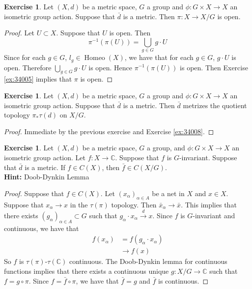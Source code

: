 \documentclass[12pt]{amsart}
\theoremstyle{definition}
\newtheorem{ex}[definition]{Exercise}
\newcommand{\al}{\alpha}
\newcommand{\C}{\mathbb{C}}
\newcommand{\conv}[1]{\xrightarrow{#1}}
\DeclareMathOperator{\Homeo}{Homeo}
\newcommand{\rex}[1]{Exercise \ref{ex:#1}}
\begin{document}
	\begin{ex}
	Let $(X,d)$ be a metric space, $G$ a group and $\phi: G \times X \rightarrow X$ an isometric group action. Suppose that $\bar{d}$ is a metric. Then $\pi:X \rightarrow X/G$ is open.
	\end{ex}
	
	\begin{proof}
	Let $U \subset X$. Suppose that $U$ is open. Then 
	\begin{equation*}
	\pi^{-1}(\pi(U)) = \bigcup_{g \in G} g \cdot U
	\end{equation*}		
	Since for each $g \in G$, $l_g \in \Homeo(X)$, we have that for each $g \in G$, $g \cdot U$ is open. Therefore $\bigcup\limits_{g \in G} g \cdot U$ is open. Hence $\pi^{-1}(\pi(U))$ is open. Then \rex{34005} implies that $\pi$ is open.
	\end{proof}
	
	\begin{ex}
	Let $(X,d)$ be a metric space, $G$ a group and $\phi: G \times X \rightarrow X$ an isometric group action. Suppose that $\bar{d}$ is a metric. Then $\bar{d}$ metrizes the quotient topology $\pi_*\tau(d)$ on $X/G$.
	\end{ex}
	
	\begin{proof}
	Immediate by the previous exercise and \rex{34008}.
	\end{proof}
	
	\begin{ex}
	Let $(X, d)$ be a metric space, $G$ a group, and $\phi: G \times X \rightarrow X$ an isometric group action. Let $f: X \rightarrow \C$. Suppose that $f$ is $G$-invariant. Suppose that $\bar{d}$ is a metric. If $f \in C(X)$, then $\bar{f} \in C(X/G)$.  \\
	\textbf{Hint:} Doob-Dynkin Lemma
	\end{ex}
	
	\begin{proof}
	Suppose that $f \in C(X)$. Let $(x_{\al})_{\al \in A}$ be a net in $X$ and $x \in X$. Suppose that $x_{\al} \rightarrow x$ in the $\tau(\pi)$ topology. Then $\bar{x}_{\al} \rightarrow \bar{x}$. This implies that there exists $(g_{\al})_{\al \in A} \subset G$ such that $g_{\al} \cdot x_{\al} \conv{d} x$. Since $f$ is $G$-invariant and continuous, we have that 
	\begin{align*}
	f(x_{\al})
	&= f(g_{\al} \cdot x_{\al}) \\
	& \rightarrow f(x)
	\end{align*}
	So $f$ is $\tau(\pi)$-$\tau(\C)$ continuous. The Doob-Dynkin lemma for continuous functions implies that there exists a continuous unique $g:X/G \rightarrow \C$ such that $f = g \circ \pi$. Since $f = \bar{f} \circ \pi$, we have that $\bar{f} = g$ and $\bar{f}$ is continuous.
	\end{proof}
	
\end{document}
